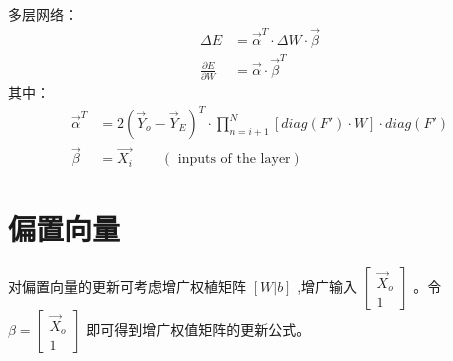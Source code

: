 \documentclass{article}
\begin{document}
多层网络：
\begin{align*}
\Delta E &= \vec{\alpha}^T\cdot\Delta W\cdot \vec{\beta} \\
\frac{\partial E}{\partial W} &= \vec{\alpha}\cdot\vec \beta^T
\end{align*}
其中：
\begin{align*}
\vec{\alpha}^T&=2(\vec Y_o-\vec Y_E)^T\cdot \prod_{n=i+1}^{N}[diag(F') \cdot W ]\cdot diag(F') \\
\vec{\beta}&=\vec{X_i}\qquad (\text{ inputs of the layer})
\end{align*}


\section{偏置向量}
对偏置向量的更新可考虑增广权植矩阵 $[W|b]$ ,增广输入 $\begin{bmatrix} \vec X_o  \\ 1\end{bmatrix}$ 。令 $\beta=\begin{bmatrix} \vec X_o \\ 1\end{bmatrix}$ 即可得到增广权值矩阵的更新公式。
\end{document}
